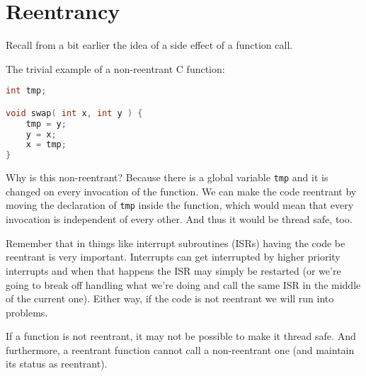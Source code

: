 




\section*{Reentrancy}

Recall from a bit earlier the idea of a side effect of a function call. 

The trivial example of a non-reentrant C function:
\begin{lstlisting}[language=C]
int tmp;

void swap( int x, int y ) {
    tmp = y;
    y = x;
    x = tmp;
}
\end{lstlisting}

Why is this non-reentrant? Because there is a global variable \texttt{tmp} and it is changed on every invocation of the function. We can make the code reentrant by moving the declaration of \texttt{tmp} inside the function, which would mean that every invocation is independent of every other. And thus it would be thread safe, too.

Remember that in things like interrupt subroutines (ISRs) having the code be reentrant is very important. Interrupts can get interrupted by higher priority interrupts and when that happens the ISR may simply be restarted (or we're going to break off handling what we're doing and call the same ISR in the middle of the current one). Either way, if the code is not reentrant we will run into problems.

If a function is not reentrant, it may not be possible to make it thread safe. And furthermore, a reentrant function cannot call a non-reentrant one (and maintain its status as reentrant).

